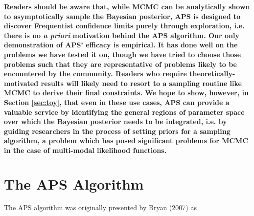 \documentclass[useAMS,usenatbib]{aastex}
\begin{document}
{\bf %
Readers should be aware that, while MCMC can be analytically shown to
asymptotically sample the Bayesian posterior, APS is designed to discover
Frequentist confidence limits purely through exploration, i.e. there is no {\it a
priori} motivation behind the APS algorithm.  Our only demonstration of APS'
efficacy is empirical.  It has done well on the problems we have tested it on,
though we have tried to choose those problems such that they are representative of
problems likely to be encountered by the community.  Readers who require
theoretically-motivated results will likely need to resort to a sampling routine
like MCMC to derive their final constraints.  We hope to show, however, in Section
\ref{sec:toy}, that even in these use cases, APS can provide a valuable service by
identifying the general regions of parameter space over which the Bayesian
posterior needs to be integrated, i.e. by guiding researchers in the process of setting
priors for a sampling algorithm, a problem which has posed significant problems
for MCMC in the case of multi-modal likelihood functions.
} %


\section{The APS Algorithm}
\label{sec:algorithm}

The APS algorithm was originally presented by Bryan (2007) as
\end{document}
